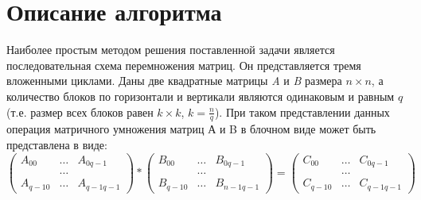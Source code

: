 \documentclass{report}
\begin{document}
\section*{Описание алгоритма}
Наиболее простым методом решения поставленной задачи является последовательная схема перемножения матриц. Он представляется тремя вложенными циклами.
Даны две квадратные матрицы {\itshape A} и {\itshape B} размера {\itshape $n \times n$}, а количество блоков по горизонтали и вертикали являются одинаковым и равным {\itshape $q$} (т.е. размер всех блоков равен {\itshape $k \times k$}, {\itshape $k = \frac{n}{q} $}). При таком представлении данных операция матричного умножения матриц А и B в блочном виде может быть представлена в виде:
$$
\begin{pmatrix}
A_{00}& \ldots & A_{0q-1}\\
& \ldots\\
A_{q-10}& \ldots & A_{q-1q-1}
\end{pmatrix}
*
\begin{pmatrix}
B_{00}& \ldots & B_{0q-1}\\
& \ldots\\
B_{q-10}& \ldots & B_{n-1q-1}
\end{pmatrix}
=
\begin{pmatrix}
C_{00}& \ldots & C_{0q-1}\\
&\ldots\\
C_{q-10}& \ldots & C_{q-1q-1}
\end{pmatrix}
$$
\end{document}
